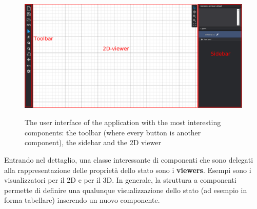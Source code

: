 \begin{figure}[h]
\centering
\includegraphics[width=0.65\linewidth]{contents/images/ui}\\
\caption{The user interface of the application with the most interesting components: the toolbar (where every button is another component), the sidebar and the 2D viewer}
\label{fig_ui}
\end{figure}

Entrando nel dettaglio, una classe interessante di componenti che sono delegati alla rappresentazione delle propriet\`a dello stato sono i \textbf{viewers}. Esempi sono i visualizzatori per il 2D e per il 3D. In generale, la struttura a componenti permette di definire una qualunque visualizzazione dello stato (ad esempio in forma tabellare) inserendo un nuovo componente.\\

